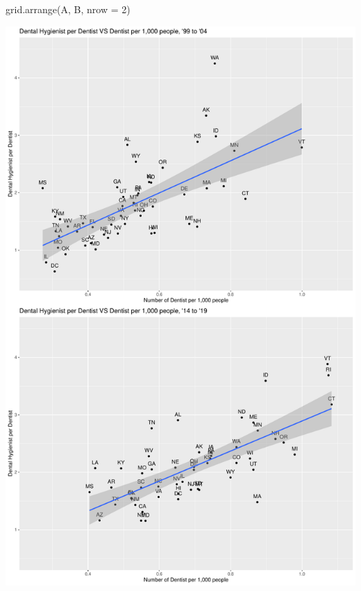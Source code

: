\documentclass[
]{article}
\newenvironment{Shaded}{\begin{snugshade}}{\end{snugshade}}
\newcommand{\AttributeTok}[1]{\textcolor[rgb]{0.77,0.63,0.00}{#1}}
\newcommand{\DecValTok}[1]{\textcolor[rgb]{0.00,0.00,0.81}{#1}}
\newcommand{\FunctionTok}[1]{\textcolor[rgb]{0.00,0.00,0.00}{#1}}
\newcommand{\NormalTok}[1]{#1}
\begin{document}
\begin{Shaded}
\begin{Highlighting}[]
\FunctionTok{grid.arrange}\NormalTok{(A, B, }\AttributeTok{nrow =} \DecValTok{2}\NormalTok{)}
\end{Highlighting}
\end{Shaded}

\includegraphics{Change_By_State_Graphic_Reproduction_files/figure-latex/unnamed-chunk-15-1.pdf}
\end{document}

